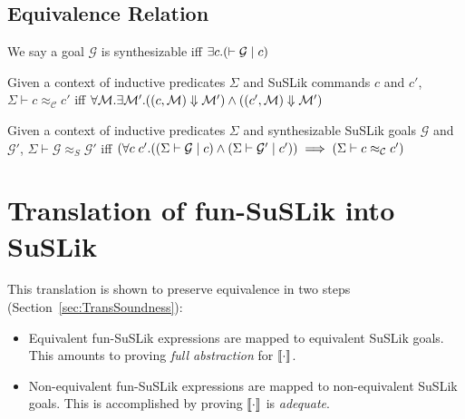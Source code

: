 \documentclass[10pt]{article}
\begin{document}
\subsection{Equivalence Relation}
\label{sec:SuSLikEquiv}

\begin{definition}[Synthesizability]
  We say a goal $\mathcal{G}$ is \textnormal{synthesizable} iff $\exists c. (\vdash \mathcal{G}\;|\; c)$
\end{definition}

\begin{definition}
  Given a context of inductive predicates $\Sigma$ and SuSLik commands $c$ and $c'$, $\Sigma \vdash c \approx_\mathcal{C} c'$ iff
    $\forall \mathcal{M}. \exists \mathcal{M'}.
      ((c, \mathcal{M}) \Downarrow \mathcal{M'})
      \land
      ((c', \mathcal{M}) \Downarrow \mathcal{M'})$
\end{definition}

\begin{definition}
  Given a context of inductive predicates $\Sigma$ and synthesizable SuSLik goals $\mathcal{G}$ and $\mathcal{G}'$, $\Sigma \vdash \mathcal{G} \approx_{S} \mathcal{G}'$ iff
    $(\forall c\; c'. ((\Sigma \vdash \mathcal{G} \;|\; c) \land (\Sigma \vdash \mathcal{G}' \;|\; c')) \implies (\Sigma \vdash c \approx_{\mathcal{C}} c')$
\end{definition}

\section{Translation of fun-SuSLik into SuSLik}
\label{sec:Translation}

This translation is shown to preserve equivalence in two steps (Section~\ref{sec:TransSoundness}):

\begin{itemize}
  \item Equivalent fun-SuSLik expressions are mapped to equivalent SuSLik goals. This amounts to proving
    \textit{full abstraction} for $\llbracket\cdot\rrbracket$.
  \item Non-equivalent fun-SuSLik expressions are mapped to non-equivalent SuSLik goals.
    This is accomplished by proving $\llbracket\cdot\rrbracket$ is \textit{adequate}.
\end{itemize}
\end{document}
